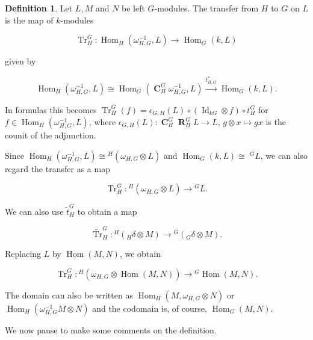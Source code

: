 \documentclass[12pt]{amsart}
\theoremstyle{definition}
\newtheorem{definition}[theorem]{Definition}
\DeclareMathOperator{\coind}{\mathbf{C}}
\DeclareMathOperator{\res}{\mathbf{R}}
\DeclareMathOperator{\Hom}{Hom}
\DeclareMathOperator{\Tr}{Tr}
\DeclareMathOperator{\ide}{Id}
\begin{document}
\begin{definition}\label{def:transfer}
	Let $L, M$ and $N$ be left $G$-modules. The transfer from $H$ to $G$ on $L$ is the map of $k$-modules
	
	\[\Tr _H^G  \! : \Hom_H( \omega^{-1}_{H,G}, L) \rightarrow \Hom_G(k,L)\]
	
	given by
	
	\[ \Hom_H (\omega_{H,G}^{-1}, L) \cong \Hom_G(\coind^G_H \omega_{H,G}^{-1},L) \xrightarrow{t^*_{H,G}} \Hom_G(k,L).\]
	
	In formulas this becomes $\Tr^G_H(f) = \epsilon_{G,H}(L) \circ (\ide_{kG} \otimes f) \circ t^G_H$ for $f
	\in \Hom_H (\omega_{H,G}^{-1}, L)$, where $\epsilon_{G,H}(L) \! : \coind ^G_H  \res ^G_H L \rightarrow L$, $g \otimes x \mapsto gx$ is the counit of the adjunction.
	
	Since $\Hom_H( \omega^{-1}_{H,G}, L) \cong {}^H(\omega_{H,G} \otimes L ) $ and $\Hom_G(k,L) \cong\;^G L$, we can also regard the transfer as a map 
	
		\[ \Tr_H^G \! :  {}^H(\omega_{H,G} \otimes L ) \rightarrow {}^G L. \]
	
	We can also use $\tilde{t}^G_H$ to obtain a map
	
		\[ \tilde{\Tr}_H^G \! :  {}^H({}_H \delta \otimes M ) \rightarrow {}^G({}_G \delta \otimes M). \]
		
		Replacing $L$ by $\Hom (M,N)$, we obtain
		
			\[ \Tr_H^G \! :  {}^H(\omega_{H,G} \otimes \Hom (M,N) ) \rightarrow {}^G \Hom (M,N). \]
			
			The domain can also be written as $\Hom_H(M,\omega _{H,G} \otimes N)$ or $\Hom_H(\omega _{H,G}^{-1} M \otimes N)$ and the codomain is, of course, $\Hom_G(M,N)$. 


\end{definition}
We now pause to make some comments on the definition.
\end{document}
